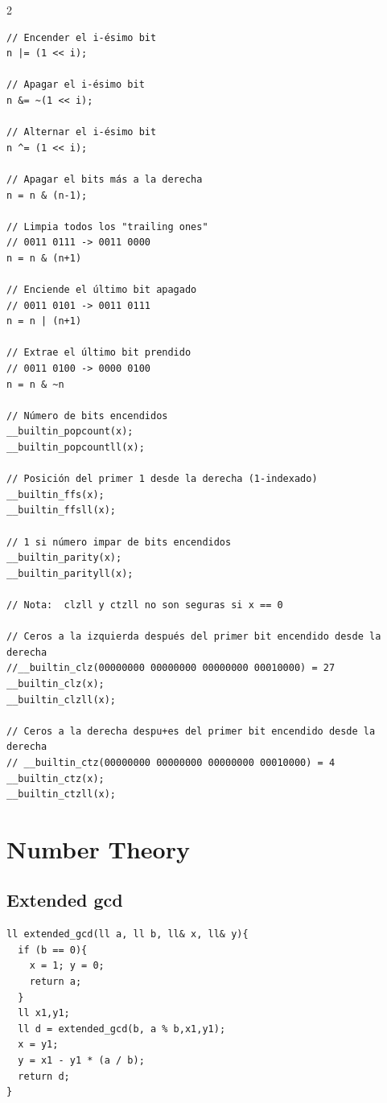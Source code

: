 \documentclass[twoside]{article}
\begin{document}
\begin{multicols*}{2}
\begin{verbatim}
// Encender el i-ésimo bit
n |= (1 << i);

// Apagar el i-ésimo bit
n &= ~(1 << i);

// Alternar el i-ésimo bit
n ^= (1 << i);

// Apagar el bits más a la derecha 
n = n & (n-1); 

// Limpia todos los "trailing ones"
// 0011 0111 -> 0011 0000
n = n & (n+1)

// Enciende el último bit apagado 
// 0011 0101 -> 0011 0111
n = n | (n+1) 

// Extrae el último bit prendido
// 0011 0100 -> 0000 0100 
n = n & ~n 

// Número de bits encendidos
__builtin_popcount(x); 
__builtin_popcountll(x); 

// Posición del primer 1 desde la derecha (1-indexado)
__builtin_ffs(x);     
__builtin_ffsll(x); 

// 1 si número impar de bits encendidos
__builtin_parity(x); 
__builtin_parityll(x); 

// Nota:  clzll y ctzll no son seguras si x == 0

// Ceros a la izquierda después del primer bit encendido desde la derecha
//__builtin_clz(00000000 00000000 00000000 00010000) = 27
__builtin_clz(x); 
__builtin_clzll(x); 

// Ceros a la derecha despu+es del primer bit encendido desde la derecha 
// __builtin_ctz(00000000 00000000 00000000 00010000) = 4 
__builtin_ctz(x); 
__builtin_ctzll(x); 

\end{verbatim}

	{
		\section*{Number Theory}
	}
	{
		\subsection*{Extended gcd}
	}
	\begin{verbatim}
ll extended_gcd(ll a, ll b, ll& x, ll& y){
  if (b == 0){
    x = 1; y = 0;
    return a;
  }
  ll x1,y1;
  ll d = extended_gcd(b, a % b,x1,y1);
  x = y1;
  y = x1 - y1 * (a / b);
  return d;
}
\end{verbatim}


\end{multicols*}
\end{document}
